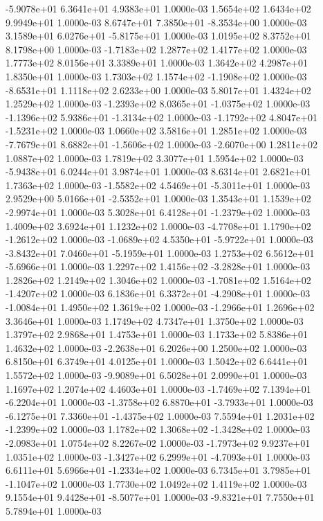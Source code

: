 -5.9078e+01  6.3641e+01  4.9383e+01  1.0000e-03
1.5654e+02 1.6434e+02 9.9949e+01  1.0000e-03
 8.6747e+01  7.3850e+01 -8.3534e+00  1.0000e-03
 3.1589e+01  6.0276e+01 -5.8175e+01  1.0000e-03
1.0195e+02 8.3752e+01 8.1798e+00  1.0000e-03
-1.7183e+02  1.2877e+02  1.4177e+02  1.0000e-03
1.7773e+02 8.0156e+01 3.3389e+01  1.0000e-03
1.3642e+02 4.2987e+01 1.8350e+01  1.0000e-03
 1.7303e+02  1.1574e+02 -1.1908e+02  1.0000e-03
-8.6531e+01  1.1118e+02  2.6233e+00  1.0000e-03
5.8017e+01 1.4324e+02 1.2529e+02  1.0000e-03
-1.2393e+02  8.0365e+01 -1.0375e+02  1.0000e-03
-1.1396e+02  5.9386e+01 -1.3134e+02  1.0000e-03
-1.1792e+02  4.8047e+01 -1.5231e+02  1.0000e-03
1.0660e+02 3.5816e+01 1.2851e+02  1.0000e-03
-7.7679e+01  8.6882e+01 -1.5606e+02  1.0000e-03
-2.6070e+00  1.2811e+02  1.0887e+02  1.0000e-03
1.7819e+02 3.3077e+01 1.5954e+02  1.0000e-03
-5.9438e+01  6.0244e+01  3.9874e+01  1.0000e-03
8.6314e+01 2.6821e+01 1.7363e+02  1.0000e-03
-1.5582e+02  4.5469e+01 -5.3011e+01  1.0000e-03
 2.9529e+00  5.0166e+01 -2.5352e+01  1.0000e-03
 1.3543e+01  1.1539e+02 -2.9974e+01  1.0000e-03
 5.3028e+01  6.4128e+01 -1.2379e+02  1.0000e-03
1.4009e+02 3.6924e+01 1.1232e+02  1.0000e-03
-4.7708e+01  1.1790e+02 -1.2612e+02  1.0000e-03
-1.0689e+02  4.5350e+01 -5.9722e+01  1.0000e-03
-3.8432e+01  7.0460e+01 -5.1959e+01  1.0000e-03
 1.2753e+02  6.5612e+01 -5.6966e+01  1.0000e-03
 1.2297e+02  1.4156e+02 -3.2828e+01  1.0000e-03
1.2826e+02 1.2149e+02 1.3046e+02  1.0000e-03
-1.7081e+02  1.5164e+02 -1.4207e+02  1.0000e-03
 6.1836e+01  6.3372e+01 -4.2908e+01  1.0000e-03
-1.0084e+01  1.4950e+02  1.3619e+02  1.0000e-03
-1.2966e+01  1.2696e+02  3.3646e+01  1.0000e-03
1.1749e+02 4.7347e+01 1.3750e+02  1.0000e-03
1.3797e+02 2.9868e+01 1.4753e+01  1.0000e-03
1.1733e+02 5.8386e+01 1.4632e+02  1.0000e-03
-2.2638e+01  6.2026e+00  1.2500e+02  1.0000e-03
6.8150e+01 6.3749e+01 4.0125e+01  1.0000e-03
1.5042e+02 6.6441e+01 1.5572e+02  1.0000e-03
-9.9089e+01  6.5028e+01  2.0990e+01  1.0000e-03
1.1697e+02 1.2074e+02 4.4603e+01  1.0000e-03
-1.7469e+02  7.1394e+01 -6.2204e+01  1.0000e-03
-1.3758e+02  6.8870e+01 -3.7933e+01  1.0000e-03
-6.1275e+01  7.3360e+01 -1.4375e+02  1.0000e-03
 7.5594e+01  1.2031e+02 -1.2399e+02  1.0000e-03
 1.1782e+02  1.3068e+02 -1.3428e+02  1.0000e-03
-2.0983e+01  1.0754e+02  8.2267e-02  1.0000e-03
-1.7973e+02  9.9237e+01  1.0351e+02  1.0000e-03
-1.3427e+02  6.2999e+01 -4.7093e+01  1.0000e-03
 6.6111e+01  5.6966e+01 -1.2334e+02  1.0000e-03
 6.7345e+01  3.7985e+01 -1.1047e+02  1.0000e-03
1.7730e+02 1.0492e+02 1.4119e+02  1.0000e-03
 9.1554e+01  9.4428e+01 -8.5077e+01  1.0000e-03
-9.8321e+01  7.7550e+01  5.7894e+01  1.0000e-03
